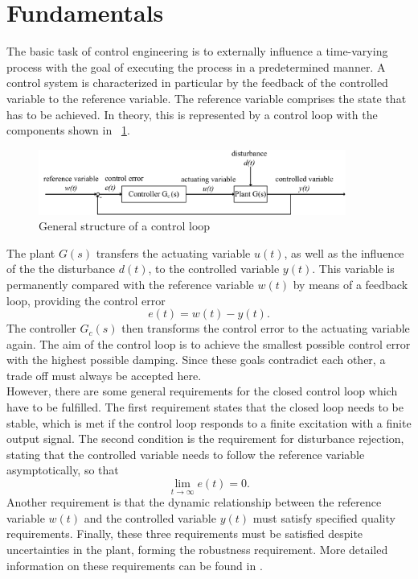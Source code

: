 \section{Fundamentals}
The basic task of control engineering is to externally influence a time-varying process with the goal of executing the process in a predetermined manner. A control system is characterized in particular by the feedback of the controlled variable to the reference variable. The reference variable comprises the state that has to be achieved.
In theory, this is represented by a control loop with the components shown in \figurename~{\ref{fig:control_loop}}.
\begin{figure}
  \centering
  \includegraphics[width=0.9\textwidth]{images/control_loop.pdf}
  \caption[General structure of a control loop]{General structure of a control loop}
  \label{fig:control_loop}
\end{figure}
The plant $G(s)$ transfers the actuating variable $u(t)$, as well as the influence of the the disturbance $d(t)$, to the controlled variable $y(t)$. This variable is permanently compared with the reference variable $w(t)$ by means of a feedback loop, providing the control error
\begin{equation}
  e(t) = w(t) - y(t).
 \label{eq:e_t}
\end{equation}
The controller $G_{c}(s)$ then transforms the control error to the actuating variable again. The aim of the control loop is to achieve the smallest possible control error with the highest possible damping. Since these goals contradict each other, a trade off must always be accepted here. \cite{Reg_17}
\\However, there are some general requirements for the closed control loop which have to be fulfilled. The first requirement states that the closed loop needs to be stable, which is met if the control loop responds to a finite excitation with a finite output signal. The second condition is the requirement for disturbance rejection, stating that the controlled variable needs to follow the reference variable asymptotically, so that
\begin{equation}
    \lim\limits_{t \rightarrow \infty}{e(t)} = 0.
 \label{eq:lim_e}
\end{equation}
Another requirement is that the dynamic relationship between the reference variable $w(t)$ and the controlled variable $y(t)$ must satisfy specified quality requirements.  Finally, these three requirements must be satisfied despite uncertainties in the plant, forming the robustness requirement. More detailed information on these requirements can be found in \cite{Reg_10}.

